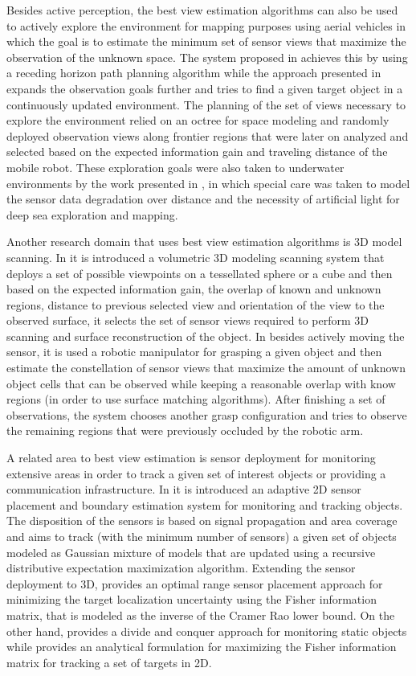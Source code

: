 Besides active perception, the best view estimation algorithms can also be used to actively explore the environment for mapping purposes using aerial vehicles in which the goal is to estimate the minimum set of sensor views that maximize the observation of the unknown space. The system proposed in \cite{Bircher2016} achieves this by using a receding horizon path planning algorithm while the approach presented in \cite{Gedicke2016} expands the observation goals further and tries to find a given target object in a continuously updated environment. The planning of the set of views necessary to explore the environment relied on an octree for space modeling and randomly deployed observation views along frontier regions that were later on analyzed and selected based on the expected information gain and traveling distance of the mobile robot. These exploration goals were also taken to underwater environments by the work presented in \cite{Sheinin2016}, in which special care was taken to model the sensor data degradation over distance and the necessity of artificial light for deep sea exploration and mapping.

Another research domain that uses best view estimation algorithms is 3D model scanning. In \cite{Irving2014} it is introduced a volumetric 3D modeling scanning system that deploys a set of possible viewpoints on a tessellated sphere or a cube and then based on the expected information gain, the overlap of known and unknown regions, distance to previous selected view and orientation of the view to the observed surface, it selects the set of sensor views required to perform 3D scanning and surface reconstruction of the object.
In \cite{Krainin2011} besides actively moving the sensor, it is used a robotic manipulator for grasping a given object and then estimate the constellation of sensor views that maximize the amount of unknown object cells that can be observed while keeping a reasonable overlap with know regions (in order to use surface matching algorithms). After finishing a set of observations, the system chooses another grasp configuration and tries to observe the remaining regions that were previously occluded by the robotic arm.

A related area to best view estimation is sensor deployment for monitoring extensive areas in order to track a given set of interest objects or providing a communication infrastructure. In \cite{Guo2008} it is introduced an adaptive 2D sensor placement and boundary estimation system for monitoring and tracking objects. The disposition of the sensors is based on signal propagation and area coverage and aims to track (with the minimum number of sensors) a given set of objects modeled as Gaussian mixture of models that are updated using a recursive distributive expectation maximization algorithm. Extending the sensor deployment to 3D, \cite{Zhao2013} provides an optimal range sensor placement approach for minimizing the target localization uncertainty using the Fisher information matrix, that is modeled as the inverse of the Cramer Rao lower bound. On the other hand, \cite{Yuan2008} provides a divide and conquer approach for monitoring static objects while \cite{Salinas2013} provides an analytical formulation for maximizing the Fisher information matrix for tracking a set of targets in 2D.


